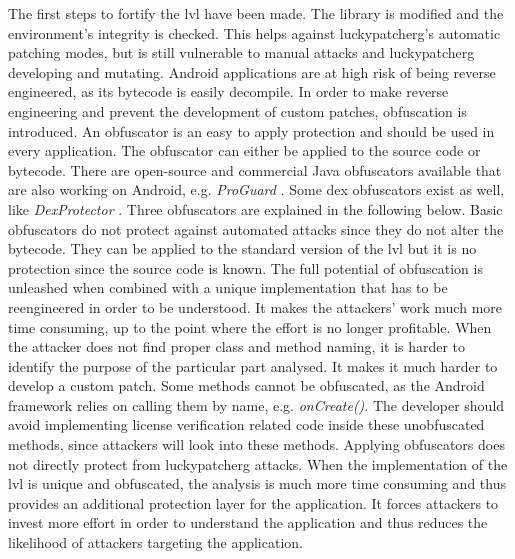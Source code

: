 The first steps to fortify the \gls{lvl} have been made.
The library is modified and the environment's integrity is checked.
This helps against \gls{luckypatcherg}'s automatic patching modes, but is still vulnerable to manual attacks and \gls{luckypatcherg} developing and mutating.
Android applications are at high risk of being reverse engineered, as its bytecode is easily decompile.
In order to make reverse engineering and prevent the development of custom patches, obfuscation is introduced.
\newline
An obfuscator is an easy to apply protection and should be used in every application.
The obfuscator can either be applied to the source code or bytecode.
There are open-source and commercial Java obfuscators available that are also working on Android, e.g. \textit{ProGuard} \cite{proguard}.
Some dex obfuscators exist as well, like \textit{DexProtector} \cite{dexProtector}.
Three obfuscators are explained in the following below.
\newline
Basic obfuscators do not protect against automated attacks since they do not alter the bytecode.
They can be applied to the standard version of the \gls{lvl} but it is no protection since the source code is known.
The full potential of obfuscation is unleashed when combined with a unique implementation that has to be reengineered in order to be understood.
It makes the attackers' work much more time consuming, up to the point where the effort is no longer profitable.
When the attacker does not find proper class and method naming, it is harder to identify the purpose of the particular part analysed.
It makes it much harder to develop a custom patch. \cite{developersSecuring}
\newline
Some methods cannot be obfuscated, as the Android framework relies on calling them by name, e.g. \textit{onCreate()}.
The developer should avoid implementing license verification related code inside these unobfuscated methods, since attackers will look into these methods.
\cite{developersSecuring}
\newline
\newline
Applying obfuscators does not directly protect from \gls{luckypatcherg} attacks.
When the implementation of the \gls{lvl} is unique and obfuscated, the analysis is much more time consuming and thus provides an additional protection layer for the application.
It forces attackers to invest more effort in order to understand the application and thus reduces the likelihood of attackers targeting the application.
